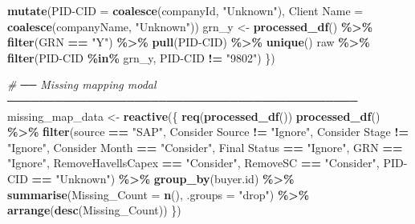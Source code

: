 \documentclass[
]{article}
\newenvironment{Shaded}{\begin{snugshade}}{\end{snugshade}}
\newcommand{\AttributeTok}[1]{\textcolor[rgb]{0.13,0.29,0.53}{#1}}
\newcommand{\CommentTok}[1]{\textcolor[rgb]{0.56,0.35,0.01}{\textit{#1}}}
\newcommand{\FunctionTok}[1]{\textcolor[rgb]{0.13,0.29,0.53}{\textbf{#1}}}
\newcommand{\NormalTok}[1]{#1}
\newcommand{\OtherTok}[1]{\textcolor[rgb]{0.56,0.35,0.01}{#1}}
\newcommand{\SpecialCharTok}[1]{\textcolor[rgb]{0.81,0.36,0.00}{\textbf{#1}}}
\newcommand{\StringTok}[1]{\textcolor[rgb]{0.31,0.60,0.02}{#1}}
\begin{document}
\begin{Shaded}
\begin{Highlighting}[]
        \FunctionTok{mutate}\NormalTok{(}\StringTok{\textasciigrave{}}\AttributeTok{PID{-}CID}\StringTok{\textasciigrave{}} \OtherTok{=} \FunctionTok{coalesce}\NormalTok{(companyId, }\StringTok{"Unknown"}\NormalTok{), }\StringTok{\textasciigrave{}}\AttributeTok{Client Name}\StringTok{\textasciigrave{}} \OtherTok{=} \FunctionTok{coalesce}\NormalTok{(companyName, }\StringTok{"Unknown"}\NormalTok{))}
\NormalTok{      grn\_y }\OtherTok{\textless{}{-}} \FunctionTok{processed\_df}\NormalTok{() }\SpecialCharTok{\%\textgreater{}\%} \FunctionTok{filter}\NormalTok{(GRN }\SpecialCharTok{==} \StringTok{"Y"}\NormalTok{) }\SpecialCharTok{\%\textgreater{}\%} \FunctionTok{pull}\NormalTok{(}\StringTok{\textasciigrave{}}\AttributeTok{PID{-}CID}\StringTok{\textasciigrave{}}\NormalTok{) }\SpecialCharTok{\%\textgreater{}\%} \FunctionTok{unique}\NormalTok{()}
\NormalTok{      raw }\SpecialCharTok{\%\textgreater{}\%} \FunctionTok{filter}\NormalTok{(}\StringTok{\textasciigrave{}}\AttributeTok{PID{-}CID}\StringTok{\textasciigrave{}} \SpecialCharTok{\%in\%}\NormalTok{ grn\_y, }\StringTok{\textasciigrave{}}\AttributeTok{PID{-}CID}\StringTok{\textasciigrave{}} \SpecialCharTok{!=} \StringTok{"9802"}\NormalTok{)}
\NormalTok{    \})}
    
    \CommentTok{\# ── Missing mapping modal ────────────────────────────────────────────}
\NormalTok{    missing\_map\_data }\OtherTok{\textless{}{-}} \FunctionTok{reactive}\NormalTok{(\{}
      \FunctionTok{req}\NormalTok{(}\FunctionTok{processed\_df}\NormalTok{())}
      \FunctionTok{processed\_df}\NormalTok{() }\SpecialCharTok{\%\textgreater{}\%}
        \FunctionTok{filter}\NormalTok{(source }\SpecialCharTok{==} \StringTok{"SAP"}\NormalTok{, }\StringTok{\textasciigrave{}}\AttributeTok{Consider Source}\StringTok{\textasciigrave{}} \SpecialCharTok{!=} \StringTok{"Ignore"}\NormalTok{, }\StringTok{\textasciigrave{}}\AttributeTok{Consider Stage}\StringTok{\textasciigrave{}} \SpecialCharTok{!=} \StringTok{"Ignore"}\NormalTok{,}
               \StringTok{\textasciigrave{}}\AttributeTok{Consider Month}\StringTok{\textasciigrave{}} \SpecialCharTok{==} \StringTok{"Consider"}\NormalTok{, }\StringTok{\textasciigrave{}}\AttributeTok{Final Status}\StringTok{\textasciigrave{}} \SpecialCharTok{==} \StringTok{"Ignore"}\NormalTok{, GRN }\SpecialCharTok{==} \StringTok{"Ignore"}\NormalTok{,}
\NormalTok{               RemoveHavellsCapex }\SpecialCharTok{==} \StringTok{"Consider"}\NormalTok{, RemoveSC }\SpecialCharTok{==} \StringTok{"Consider"}\NormalTok{, }\StringTok{\textasciigrave{}}\AttributeTok{PID{-}CID}\StringTok{\textasciigrave{}} \SpecialCharTok{==} \StringTok{"Unknown"}\NormalTok{) }\SpecialCharTok{\%\textgreater{}\%}
        \FunctionTok{group\_by}\NormalTok{(}\StringTok{\textasciigrave{}}\AttributeTok{buyer.id}\StringTok{\textasciigrave{}}\NormalTok{) }\SpecialCharTok{\%\textgreater{}\%} \FunctionTok{summarise}\NormalTok{(}\AttributeTok{Missing\_Count =} \FunctionTok{n}\NormalTok{(), }\AttributeTok{.groups =} \StringTok{"drop"}\NormalTok{) }\SpecialCharTok{\%\textgreater{}\%}
        \FunctionTok{arrange}\NormalTok{(}\FunctionTok{desc}\NormalTok{(Missing\_Count))}
\NormalTok{    \})}
    

\end{Highlighting}
\end{Shaded}
\end{document}
